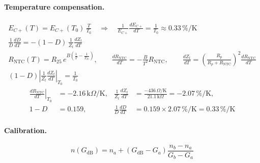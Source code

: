 \documentclass[11pt, letterpaper,titlepage]{article}
\begin{document}
\paragraph{Temperature compensation.}
\begin{gather}
    E_{C+}(T) = E_{C+}(T_0)\,\frac{T}{T_0}
    \quad\Longrightarrow\quad
    \frac{1}{E_{C+}}\frac{dE_{C+}}{dT} = \frac{1}{T_0} \approx 0.33\,\%/\mathrm{K}
    \label{eq:ptat-req}\\
    \frac{1}{D}\frac{dD}{dT} = -(1-D)\,\frac{1}{Z_t}\frac{dZ_t}{dT}
    \label{eq:dD}\\
    R_\text{NTC}(T) = R_{25}\,e^{B\left(\frac{1}{T}-\frac{1}{T_{25}}\right)}, \qquad
    \frac{dR_\text{NTC}}{dT} = -\frac{B}{T^2}R_\text{NTC}, \qquad
    \frac{dZ_t}{dT} = \left(\frac{R_p}{R_p+R_\text{NTC}}\right)^{2}\frac{dR_\text{NTC}}{dT}
    \label{eq:ntc}\\
    (1-D)\left|\frac{1}{Z_t}\frac{dZ_t}{dT}\right|_{T_0} = \frac{1}{T_0}
    \label{eq:comp-cond}
\end{gather}
\begin{align}
    \left.\frac{dR_\text{NTC}}{dT}\right|_{T_0} &= -2.16\,\mathrm{k}\Omega/\mathrm{K}, &
    \frac{1}{Z_t}\frac{dZ_t}{dT} &= \frac{-436\,\Omega/\mathrm{K}}{21.1\,\mathrm{k}\Omega} = -2.07\,\%/\mathrm{K},
    \nonumber\\
    1-D &= 0.159, &
    \frac{1}{D}\frac{dD}{dT} &= 0.159 \times 2.07\,\%/\mathrm{K} = 0.33\,\%/\mathrm{K}
    \label{eq:comp-numbers}
\end{align}

\paragraph{Calibration.}
\begin{equation}
    n(G_\text{dB}) = n_a + \left(G_\text{dB} - G_a\right)\frac{n_b - n_a}{G_b - G_a}
    \label{eq:cal}
\end{equation}
\end{document}
